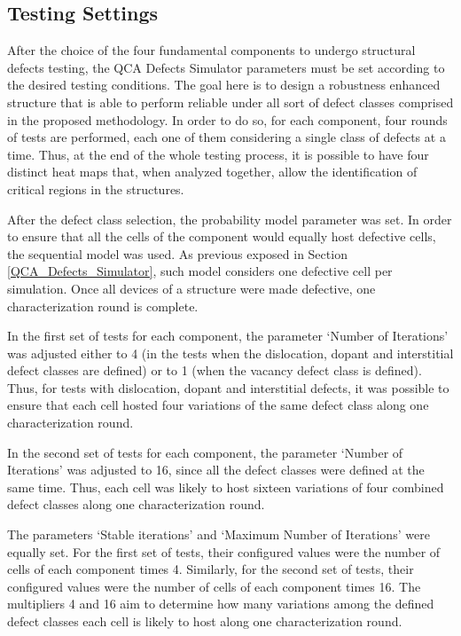 \subsection{Testing Settings}
\label{Testing_Settings}

After the choice of the four fundamental components to undergo structural defects testing, the QCA Defects Simulator parameters must be set according to the desired testing conditions. The goal here is to design a robustness enhanced structure that is able to perform reliable under all sort of defect classes comprised in the proposed methodology. In order to do so, for each component, four rounds of tests are performed, each one of them considering a single class of defects at a time. Thus, at the end of the whole testing process, it is possible to have four distinct heat maps that, when analyzed together, allow the identification of critical regions in the structures.

After the defect class selection, the probability model parameter was set. In order to ensure that all the cells of the component would equally host defective cells, the sequential model was used. As previous exposed in Section \ref{QCA_Defects_Simulator}, such model considers one defective cell per simulation. Once all devices of a structure were made defective, one characterization round is complete.

In the first set of tests for each component, the parameter `Number of Iterations' was adjusted either to 4 (in the tests when the dislocation, dopant and interstitial defect classes are defined) or to 1 (when the vacancy defect class is defined). Thus, for tests with dislocation, dopant and interstitial defects, it was possible to ensure that each cell hosted four variations of the same defect class along one characterization round.

In the second set of tests for each component, the parameter `Number of Iterations' was adjusted to 16, since all the defect classes were defined at the same time. Thus, each cell was likely to host sixteen variations of four combined defect classes along one characterization round.

The parameters `Stable iterations' and `Maximum Number of Iterations' were equally set. For the first set of tests, their configured values were the number of cells of each component times 4. Similarly, for the second set of tests, their configured values were the number of cells of each component times 16. The multipliers 4 and 16 aim to determine how many variations among the defined defect classes each cell is likely to host along one characterization round.

